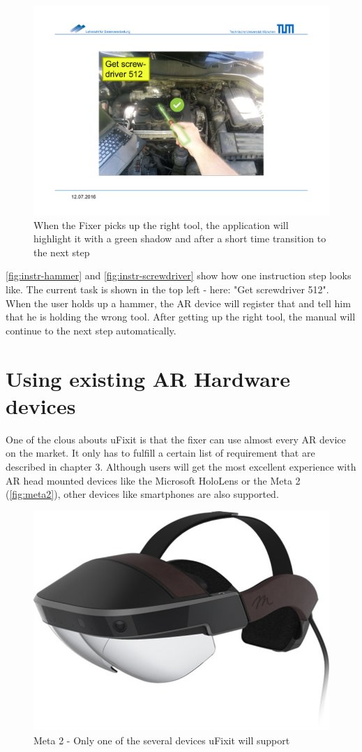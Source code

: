		\begin{figure}[H]
			\includegraphics[width=\textwidth, trim=4cm 3cm 4cm 4cm, clip]{../images/instr-screwdriver.pdf}
			\centering
			\caption{When the Fixer picks up the right tool, the application will highlight it with a green shadow and after a short time transition to the next step}
			\label{fig:instr-screwdriver}
		\end{figure}
		
		\autoref{fig:instr-hammer} and \autoref{fig:instr-screwdriver} show how one instruction step looks like. The current task is shown in the top left - here: "Get screwdriver 512". When the user holds up a hammer, the AR device will register that and tell him that he is holding the wrong tool. After getting up the right tool, the manual will continue to the next step automatically.
		
	
	\section{Using existing AR Hardware devices}
	
		One of the clous abouts uFixit is that the fixer can use almost every AR device on the market. It only has to fulfill a certain list of requirement that are described in chapter 3. Although users will get the most excellent experience with AR head mounted devices like the Microsoft HoloLens or the Meta 2 (\autoref{fig:meta2}), other devices like smartphones are also supported.
		
		\begin{figure}[H]
			\centering
			\includegraphics[width=0.5\linewidth]{../images/meta2.png}
			\caption{Meta 2 - Only one of the several devices uFixit will support}
			\label{fig:meta2}
		\end{figure}
		
